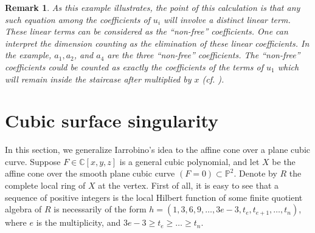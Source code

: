\documentclass[12pt,oneside,reqno]{amsart}
\newtheorem{rmk}[theorem]{Remark}
\theoremstyle{definition}
\begin{document}
\begin{rmk}
As this example illustrates, the point of this calculation is that any such equation among the coefficients of $u_i$ will involve a distinct linear term. These linear terms can be considered as the ``non-free'' coefficients. One can interpret the dimension counting as the elimination of these linear coefficients. In the example, $a_1, a_2$, and $a_4$ are the three ``non-free'' coefficients. The ``non-free'' coefficients could be counted as exactly the coefficients of the terms of $u_1$ which will remain inside the staircase after multiplied by $x$ (cf. \cite[Lemma 2.3]{I77}).
\end{rmk}

\section{Cubic surface singularity}
In this section, we generalize Iarrobino's idea to the affine cone over a plane cubic curve. Suppose $F \in \mathbb{C}[x, y, z]$ is a general cubic polynomial, and let $X$ be the affine cone over the smooth plane cubic curve $(F = 0) \subset \mathbb{P}^2$. Denote by $R$ the complete local ring of $X$ at the vertex. First of all, it is easy to see that a sequence of positive integers is the local Hilbert function of some finite quotient algebra of $R$ is necessarily of the form $h = (1, 3, 6, 9, \dots, 3e - 3, t_e, t_{e + 1}, \dots, t_n)$, where $e$ is the multiplicity, and $3e - 3 \geq t_{e} \geq \dots \geq t_n$.
\end{document}
